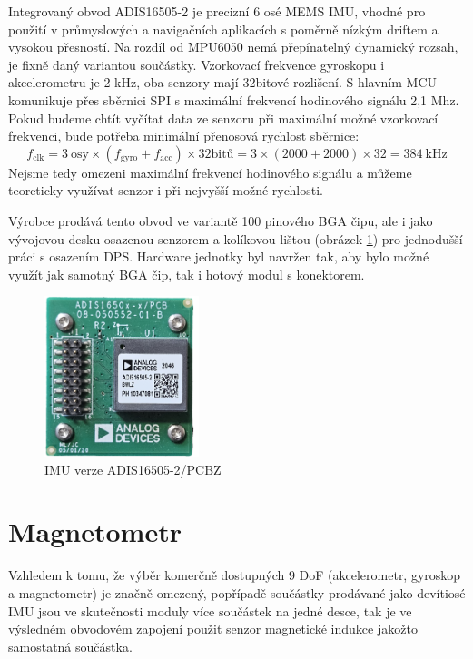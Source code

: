 Integrovaný obvod ADIS16505-2 je precizní 6 osé \ac{MEMS} \ac{IMU}, vhodné pro použití v průmyslových a navigačních aplikacích s poměrně nízkým driftem a vysokou přesností. Na rozdíl od MPU6050 nemá přepínatelný dynamický rozsah, je fixně daný variantou součástky. Vzorkovací frekvence gyroskopu i akcelerometru je 2 kHz, oba senzory mají 32bitové rozlišení. S hlavním \ac{MCU} komunikuje přes sběrnici \ac{SPI} s maximální frekvencí hodinového signálu 2,1 Mhz. \cite{UZFqHmQU7ZzI3OLB} Pokud budeme chtít vyčítat data ze senzoru při maximální možné vzorkovací frekvenci, bude potřeba minimální přenosová rychlost sběrnice: 
\begin{equation}
f_{\mathrm{clk}}=3~\mathrm{osy} \times(f_{\mathrm{gyro}} + f_{\mathrm{acc}})\times \mathrm{32bitů}=3\times(2000+2000)\times 32=\SI{384}{\kilo\hertz}
\end{equation}
Nejsme tedy omezeni maximální frekvencí hodinového signálu a můžeme teoreticky využívat senzor i při nejvyšší možné rychlosti.

Výrobce prodává tento obvod ve variantě 100 pinového \ac{BGA} čipu, ale i jako vývojovou desku osazenou senzorem a kolíkovou lištou (obrázek \ref{fig:ADIS16505PCB}) pro jednodušší práci s osazením \ac{DPS}. \cite{UZFqHmQU7ZzI3OLB} Hardware jednotky byl navržen tak, aby bylo možné využít jak samotný \ac{BGA} čip, tak i hotový modul s konektorem.

\begin{figure}[h]
    \centering
    \includegraphics[width=0.4\textwidth]{obrazky/ADIS16505PCB}
    \caption{IMU verze ADIS16505-2/PCBZ}
    \label{fig:ADIS16505PCB}
\end{figure}

\section{Magnetometr}
Vzhledem k tomu, že výběr komerčně dostupných 9 \ac{DoF} (akcelerometr, gyroskop a magnetometr) je značně omezený, popřípadě součástky prodávané jako devítiosé IMU jsou ve skutečnosti moduly více součástek na jedné desce, tak je ve výsledném obvodovém zapojení použit senzor magnetické indukce jakožto samostatná součástka. 

